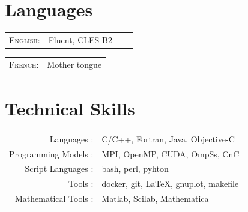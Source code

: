 \documentclass[a4paper,10pt]{article} %
\begin{document}


\section{Languages}

\begin{tabular}{rlrl}
\textsc{English:}   & Fluent, \href{http://www.certification-cles.fr}{CLES B2}\\
\end{tabular}
\hfill
\begin{tabular}{rl}
\textsc{French:}    & Mother tongue\\
\end{tabular}


\section{Technical Skills}

\begin{tabular}{rl}
Languages :                         & C/C++, Fortran, Java, Objective-C       \\
Programming Models :                & MPI, OpenMP, CUDA, OmpSs, CnC           \\
Script Languages :                  & bash, perl, pyhton                      \\
Tools :                             & docker, git, \LaTeX, gnuplot, makefile   \\
Mathematical Tools :                & Matlab, Scilab, Mathematica             \\
\end{tabular}
\end{document}
